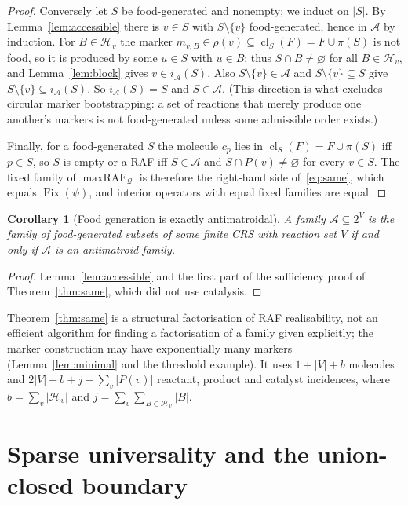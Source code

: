 \documentclass[11pt,a4paper]{article}
\theoremstyle{plain}
\newtheorem{corollary}[theorem]{Corollary}
\theoremstyle{definition}
\theoremstyle{remark}
\newcommand{\AAf}{\mathcal A}
\newcommand{\HH}{\mathcal H}
\newcommand{\QQ}{\mathcal Q}
\newcommand{\cl}{\operatorname{cl}}
\newcommand{\mraf}{\operatorname{maxRAF}}
\DeclareMathOperator{\Fix}{Fix}
\begin{document}
\begin{proof}
Conversely let $S$ be food-generated and nonempty; we induct on $|S|$. By
Lemma~\ref{lem:accessible} there is $v\in S$ with $S\setminus\{v\}$ food-generated, hence in
$\AAf$ by induction. For $B\in\HH_v$ the marker $m_{v,B}\in\rho(v)\subseteq\cl_S(F)=F\cup\pi(S)$
is not food, so it is produced by some $u\in S$ with $u\in B$; thus $S\cap B\neq\varnothing$
for all $B\in\HH_v$, and Lemma~\ref{lem:block} gives $v\in i_\AAf(S)$. Also
$S\setminus\{v\}\in\AAf$ and $S\setminus\{v\}\subseteq S$ give $S\setminus\{v\}\subseteq i_\AAf(S)$.
So $i_\AAf(S)=S$ and $S\in\AAf$. (This direction is what excludes circular marker
bootstrapping: a set of reactions that merely produce one another's markers is not
food-generated unless some admissible order exists.)

Finally, for a food-generated $S$ the molecule $c_p$ lies in $\cl_S(F)=F\cup\pi(S)$ iff
$p\in S$, so $S$ is empty or a RAF iff $S\in\AAf$ and $S\cap P(v)\neq\varnothing$ for every
$v\in S$. The fixed family of $\mraf_\QQ$ is therefore the right-hand side
of~\eqref{eq:same}, which equals $\Fix(\psi)$, and interior operators with equal fixed
families are equal.
\end{proof}

\begin{corollary}[Food generation is exactly antimatroidal]\label{cor:antimatroid}
A family $\AAf\subseteq2^V$ is the family of food-generated subsets of some finite CRS with
reaction set $V$ if and only if $\AAf$ is an antimatroid family.
\end{corollary}
\begin{proof}
Lemma~\ref{lem:accessible} and the first part of the sufficiency proof of
Theorem~\ref{thm:same}, which did not use catalysis.
\end{proof}

Theorem~\ref{thm:same} is a structural factorisation of RAF realisability, not an efficient
algorithm for finding a factorisation of a family given explicitly; the marker construction
may have exponentially many markers (Lemma~\ref{lem:minimal} and the threshold example).
It uses $1+|V|+b$ molecules and $2|V|+b+j+\sum_v|P(v)|$ reactant, product and catalyst
incidences, where $b=\sum_v|\HH_v|$ and $j=\sum_v\sum_{B\in\HH_v}|B|$.

\section{Sparse universality and the union-closed boundary}\label{sec:pair}
\end{document}
